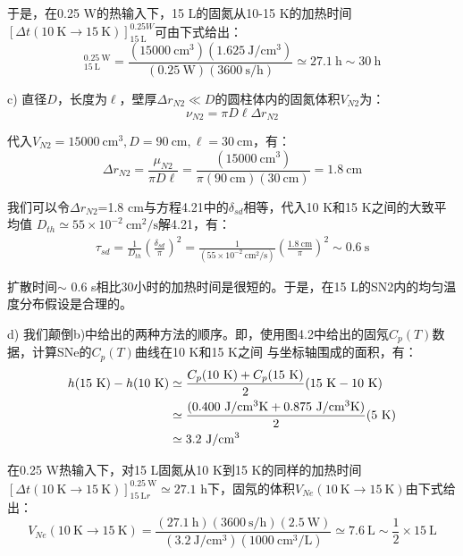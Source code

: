 于是，在0.25 W的热输入下，15 L的固氮从10-15 K的加热时间$[\Delta t(10\ \mathrm{K}\rightarrow 15\ \mathrm{K})]_{15\ \mathrm{L}}^{0.25 W}$可由下式给出： 
\begin{equation*}%
[\Delta(10\ \mathrm{K} \rightarrow 15\ \mathrm{K})]_{15\ \mathrm{L}}^{0.25\ \mathrm{W}}=\frac{(15000\ \mathrm{cm^3})(1.625\ \mathrm{J/cm^3})}{(0.25\ \mathrm{W})(3600\ \mathrm{s/h})}\simeq 27.1\ \mathrm{h}\sim 30\ \mathrm{h}
\end{equation*}

c) 直径$D$，长度为$\ell$，壁厚$\Delta r_{N2}\ll D$的圆柱体内的固氮体积$V_{N2}$为：
\begin{equation*}%
\nu_{N2}=\pi D\ell\Delta r_{N2} \tag{S3.1}
\end{equation*}

代入$V_{N2}=15000\ \mathrm{cm^3},D=90\ \mathrm{cm},\ell= 30\ \mathrm{cm}$，有：
\begin{equation*}%
\Delta r_{N2}=\frac{\mu_{N2}}{\pi D\ell}=\frac{(15000\ \mathrm{cm^3})}{\pi(90\ \mathrm{cm})(30\ \mathrm{cm})}=1.8\ \mathrm{cm}
\end{equation*}

我们可以令$\Delta r_{N2}$=1.8 cm与方程4.21中的$\delta_{sd}$相等，代入10 K和15 K之间的大致平均值
$D_{th}\simeq 55\times10^{−2}\ \mathrm{cm^2/s}$解4.21，有：
\begin{align*}%
\tau_{sd}=\frac{1}{D_{th}}(\frac{\delta_{sd}}{\pi})^2
=\frac{1}{(55\times 10^{-2}\ \mathrm{cm^2/s})}(\frac{1.8\ \mathrm{cm}}{\pi})^2\sim 0.6\ \mathrm{s} \tag{4.21}
\end{align*}

扩散时间$\sim$ 0.6 s相比30小时的加热时间是很短的。于是，在15 L的SN2内的均匀温度分布假设是合理的。

d) 我们颠倒b)中给出的两种方法的顺序。即，使用图4.2中给出的固氖$C_p(T)$数据，计算SNe的$C_p(T)$曲线在10 K和15 K之间
与坐标轴围成的面积，有：
\begin{align*}%
h(15\ \mathrm{K})-h(10\ \mathrm{K})&\simeq\frac{C_p(10\ \mathrm{K})+C_p(15\ \mathrm{K})}{2}(15\ \mathrm{K}-10\ \mathrm{K})\\\notag
&\simeq\frac{(0.400\ \mathrm{J/cm^3K}+0.875\ \mathrm{J/cm^3K})}{2}(5\ \mathrm{K})\\\notag
&\simeq 3.2\ \mathrm{J/cm^3}
\end{align*}

在0.25 W热输入下，对15 L固氮从10 K到15 K的同样的加热时间$[\Delta t(10\ \mathrm{K}\rightarrow 15\ \mathrm{K})]_{15\ \mathrm{L}r}^{0.25\ \mathrm{W}}\simeq 27.1$ h下，固氖的体积$V_{Ne}(10\ \mathrm{K}\rightarrow 15\ \mathrm{K})$由下式给出：
\begin{equation*}%
V_{Ne}(10\ \mathrm{K} \rightarrow 15\ \mathrm{K})=\frac{(27.1\ \mathrm{h})(3600\ \mathrm{s/h} )(2.5\ \mathrm{W})}{(3.2\ \mathrm{J/cm^3})(1000 \ \mathrm{cm^3/L})}
\simeq 7.6\ \mathrm{L}\sim\frac{1}{2}\times 15\ \mathrm{L}
\end{equation*}

